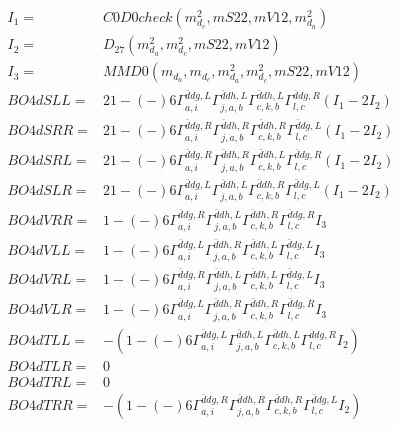 \documentclass[A4,landscape]{article}
\begin{document}
\begin{align} 
I_1 = & C0D0check(m^2_{d_{{c}}}, mS22, mV12, m^2_{d_{{a}}}) \\ 
I_2 = & D_{27}(m^2_{d_{{a}}}, m^2_{d_{{c}}}, mS22, mV12) \\ 
I_3 = & MMD0(m_{d_{{a}}}, m_{d_{{c}}}, m^2_{d_{{a}}}, m^2_{d_{{c}}}, mS22, mV12) \\ 
  BO4dSLL= & 2   1
-(-)
  6 \Gamma^{\bar{d}d g ,L}_{a, i} \Gamma^{\bar{d}d h ,L}_{j, a, b} \Gamma^{\bar{d}d h ,L}_{c, k, b} \Gamma^{\bar{d}d g ,R}_{l, c} (I_1 - 2 I_2) \\ 
  BO4dSRR= & 2   1
-(-)
  6 \Gamma^{\bar{d}d g ,R}_{a, i} \Gamma^{\bar{d}d h ,R}_{j, a, b} \Gamma^{\bar{d}d h ,R}_{c, k, b} \Gamma^{\bar{d}d g ,L}_{l, c} (I_1 - 2 I_2) \\ 
  BO4dSRL= & 2   1
-(-)
  6 \Gamma^{\bar{d}d g ,R}_{a, i} \Gamma^{\bar{d}d h ,R}_{j, a, b} \Gamma^{\bar{d}d h ,L}_{c, k, b} \Gamma^{\bar{d}d g ,R}_{l, c} (I_1 - 2 I_2) \\ 
  BO4dSLR= & 2   1
-(-)
  6 \Gamma^{\bar{d}d g ,L}_{a, i} \Gamma^{\bar{d}d h ,L}_{j, a, b} \Gamma^{\bar{d}d h ,R}_{c, k, b} \Gamma^{\bar{d}d g ,L}_{l, c} (I_1 - 2 I_2) \\ 
  BO4dVRR= &   1
-(-)
  6 \Gamma^{\bar{d}d g ,R}_{a, i} \Gamma^{\bar{d}d h ,L}_{j, a, b} \Gamma^{\bar{d}d h ,R}_{c, k, b} \Gamma^{\bar{d}d g ,R}_{l, c} I_3 \\ 
  BO4dVLL= &   1
-(-)
  6 \Gamma^{\bar{d}d g ,L}_{a, i} \Gamma^{\bar{d}d h ,R}_{j, a, b} \Gamma^{\bar{d}d h ,L}_{c, k, b} \Gamma^{\bar{d}d g ,L}_{l, c} I_3 \\ 
  BO4dVRL= &   1
-(-)
  6 \Gamma^{\bar{d}d g ,R}_{a, i} \Gamma^{\bar{d}d h ,L}_{j, a, b} \Gamma^{\bar{d}d h ,L}_{c, k, b} \Gamma^{\bar{d}d g ,L}_{l, c} I_3 \\ 
  BO4dVLR= &   1
-(-)
  6 \Gamma^{\bar{d}d g ,L}_{a, i} \Gamma^{\bar{d}d h ,R}_{j, a, b} \Gamma^{\bar{d}d h ,R}_{c, k, b} \Gamma^{\bar{d}d g ,R}_{l, c} I_3 \\ 
  BO4dTLL= & -(  1
-(-)
  6 \Gamma^{\bar{d}d g ,L}_{a, i} \Gamma^{\bar{d}d h ,L}_{j, a, b} \Gamma^{\bar{d}d h ,L}_{c, k, b} \Gamma^{\bar{d}d g ,R}_{l, c} I_2) \\ 
  BO4dTLR= & 0 \\ 
  BO4dTRL= & 0 \\ 
  BO4dTRR= & -(  1
-(-)
  6 \Gamma^{\bar{d}d g ,R}_{a, i} \Gamma^{\bar{d}d h ,R}_{j, a, b} \Gamma^{\bar{d}d h ,R}_{c, k, b} \Gamma^{\bar{d}d g ,L}_{l, c} I_2) \\ 
\end{align} 
\end{document}
